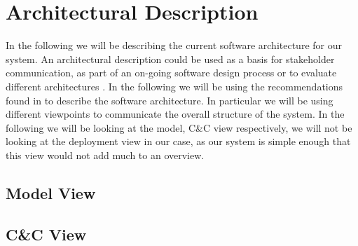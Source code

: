 \section{Architectural Description} %
\label{sec:Architectural Description}

In the following we will be describing the current software architecture for our system. An architectural description could be used as a basis for stakeholder communication, as part of an on-going software design process or to evaluate different architectures \cite{christensen}. In the following we will be using the recommendations found in \cite{christensen} to describe the software architecture. In particular we will be using different viewpoints to communicate the overall structure of the system. In the following we will be looking at the model, C\&C view respectively, we will not be looking at the deployment view in our case, as our system is simple enough that this view would not add much to an overview.

\subsection{Model View}



\subsection{C\&C View}



